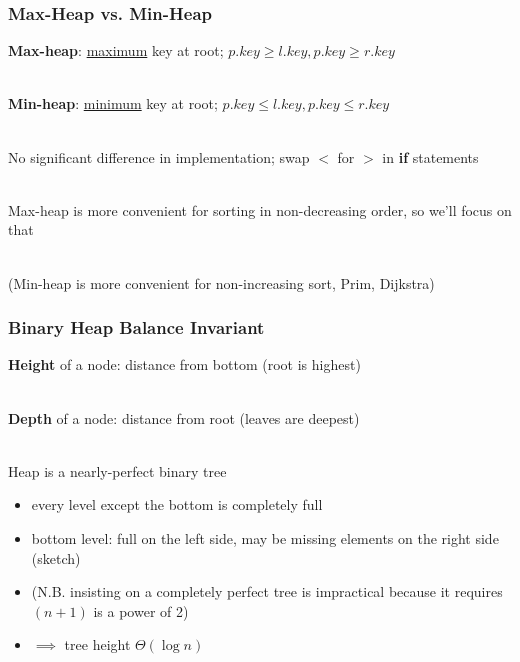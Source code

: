 \documentclass{beamer}
\newcommand{\stanza}{ \\~\ }
\begin{document}
\begin{frame} \frametitle{Max-Heap vs. Min-Heap}

\textbf{Max-heap}: \underline{maximum} key at root; $p.key \geq l.key, p.key \geq r.key$ \stanza

\textbf{Min-heap}: \underline{minimum} key at root; $p.key \leq l.key, p.key \leq r.key$ \stanza

No significant difference in implementation; swap $<$ for $>$ in \textbf{if} statements \stanza

Max-heap is more convenient for sorting in non-decreasing order, so we'll focus on that \stanza

(Min-heap is more convenient for non-increasing sort, Prim, Dijkstra)

\end{frame}

\begin{frame} \frametitle{Binary Heap Balance Invariant}

\textbf{Height} of a node: distance from bottom (root is highest) \stanza

\textbf{Depth} of a node: distance from root (leaves are deepest) \stanza

Heap is a nearly-perfect binary tree
\begin{itemize}
  \item every level except the bottom is completely full
  \item bottom level: full on the left side, may be missing elements on the
    right side (sketch)
  \item (N.B. insisting on a completely perfect tree is impractical because it requires $(n+1)$ is a power of 2)
  \item $\implies$ tree height $\Theta(\log n)$
\end{itemize}

\end{frame}
\end{document}
